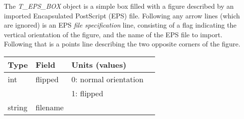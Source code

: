 The {\em T\_EPS\_BOX} object is a simple box filled with a figure
	described by an imported Encapsulated PostScript (EPS) file.
Following any arrow lines (which are ignored) is an EPS
	{\em file specification} line, consisting of a flag indicating
	the vertical orientation of the figure, and the name of the EPS file
	to import. Following that is a points line describing the two
	opposite corners of the figure.
%
\begin{center}
\begin{tabular} {|l|l|ll|}
\hline
Type	& Field			& Units (values)	&	\\ \hline
\hline
%
int	& flipped		& 0: normal orientation	&	\\ 
	& 			& 1: flipped 		&	\\ \hline
string	& filename		& 			& 	\\ \hline
\end{tabular}
\end{center}


